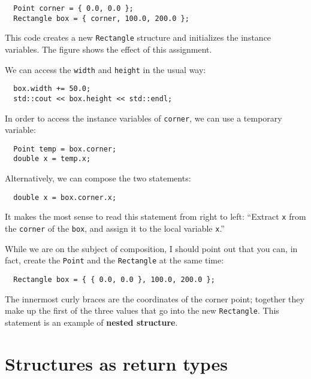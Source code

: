 \begin{verbatim}
  Point corner = { 0.0, 0.0 };
  Rectangle box = { corner, 100.0, 200.0 };
\end{verbatim}
%
This code creates a new {\tt Rectangle} structure and initializes the
instance variables.  The figure shows the effect of this assignment.

\vspace{0.1in}
\centerline{}
\vspace{0.1in}
%
We can access the {\tt width} and {\tt height} in the usual way:

\begin{verbatim}
  box.width += 50.0;
  std::cout << box.height << std::endl;
\end{verbatim}
%
In order to access the instance variables of {\tt corner}, we can use a
temporary variable:

\begin{verbatim}
  Point temp = box.corner;
  double x = temp.x;
\end{verbatim}
%
Alternatively, we can compose the two statements:


\begin{verbatim}
  double x = box.corner.x;
\end{verbatim}
%
It makes the most sense to read this statement from right to
left: ``Extract {\tt x} from the {\tt corner} of the {\tt box},
and assign it to the local variable {\tt x}.''

While we are on the subject of composition, I should point
out that you can, in fact, create the {\tt Point} and the
{\tt Rectangle} at the same time:

\begin{verbatim}
  Rectangle box = { { 0.0, 0.0 }, 100.0, 200.0 };
\end{verbatim}
%
The innermost curly braces are the coordinates of the
corner point; together they make up the first of the three
values that go into the new {\tt Rectangle}.  This statement
is an example of {\bf nested structure}.



\section{Structures as return types}

